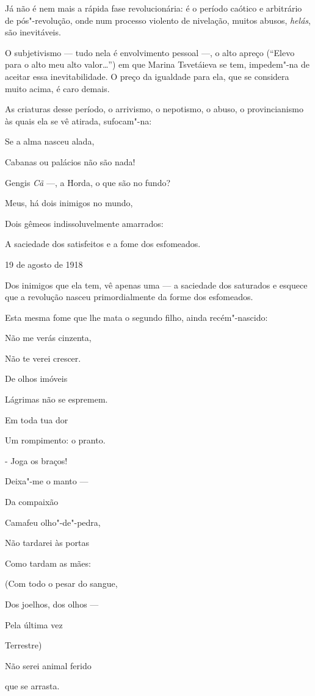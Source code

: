 Já não é nem mais a rápida fase revolucionária: é o período caótico e
arbitrário de pós"-revolução, onde num processo violento de nivelação,
muitos abusos, \emph{helás}, são inevitáveis.

O subjetivismo --- tudo nela é envolvimento pessoal ---, o alto apreço
(``Elevo para o alto meu alto valor\ldots{}'') em que Marina Tsvetáieva se
tem, impedem"-na de aceitar essa inevitabilidade. O preço da igualdade
para ela, que se considera muito acima, é caro demais.

As criaturas desse período, o arrivismo, o nepotismo, o abuso, o
provincianismo às quais ela se vê atirada, sufocam"-na:

Se a alma nasceu alada,

Cabanas ou palácios não são nada!

Gengis \emph{Cã} ---, a Horda, o que são no fundo?

Meus, há dois inimigos no mundo,

Dois gêmeos indissoluvelmente amarrados:

A saciedade dos satisfeitos e a fome dos esfomeados.

19 de agosto de 1918

Dos inimigos que ela tem, vê apenas uma --- a saciedade dos saturados e
esquece que a revolução nasceu primordialmente da forme dos esfomeados.

Esta mesma fome que lhe mata o segundo filho, ainda recém"-nascido:

Não me verás cinzenta,

Não te verei crescer.

De olhos imóveis

Lágrimas não se espremem.

Em toda tua dor

Um rompimento: o pranto.

- Joga os braços!

Deixa"-me o manto ---

Da compaixão

Camafeu olho"-de"-pedra,

Não tardarei às portas

Como tardam as mães:

(Com todo o pesar do sangue,

Dos joelhos, dos olhos ---

Pela última vez

Terrestre)

Não serei animal ferido

que se arrasta.


